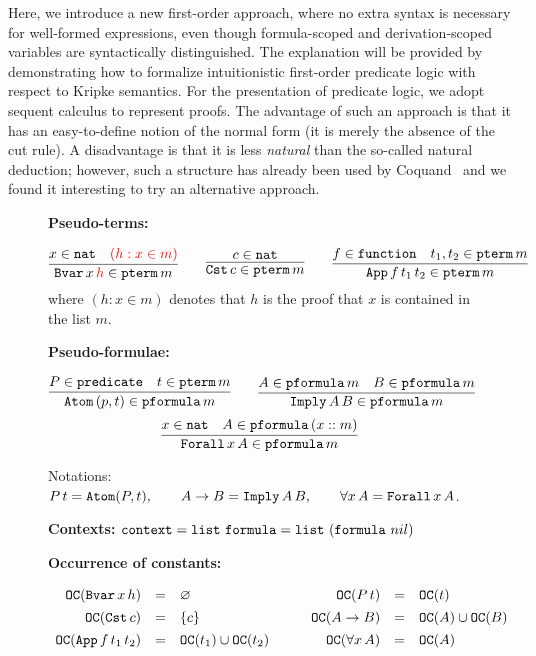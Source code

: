 \documentclass{svjour3}                     %
\newcommand{\seq}[2]{\infer{#2}{#1}}
\newcommand{\sing}[1]{\{ #1 \}}
\newcommand{\alert}[1]{\textcolor{red}{#1}}
\newcommand{\tApp}{\textup{\tt App}}
\newcommand{\tBvar}{\textup{\tt Bvar}}
\newcommand{\tCst}{\textup{\tt Cst}}
\newcommand{\tAtom}{\textup{\tt Atom}}
\newcommand{\tImply}{\textup{\tt Imply}}
\newcommand{\tForall}{\textup{\tt Forall}}
\newcommand{\tnat}{\textup{\tt nat}}
\newcommand{\tfunction}{\textup{\tt function}}
\newcommand{\tpredicate}{\textup{\tt predicate}}
\newcommand{\tpterm}{\textup{\tt pterm}}
\newcommand{\tpfml}{\textup{\tt pformula}}
\newcommand{\tfml}{\textup{\tt formula}}
\newcommand{\tcontext}{\textup{\tt context}}
\newcommand{\tOC}{\textup{\tt OC}}
\newcommand{\tlist}{\textup{\tt list}}
\begin{document}
Here, we introduce a new first-order approach, where no extra syntax is necessary for well-formed expressions, even though formula-scoped and derivation-scoped variables are syntactically distinguished. The explanation will be provided by demonstrating how to formalize intuitionistic first-order predicate logic with respect to Kripke semantics. For the presentation of predicate logic, we adopt sequent calculus to represent proofs. The advantage of such an approach is that it has an easy-to-define notion of the normal form (it is merely the absence of the cut rule). A disadvantage is that it is less \textit{natural} than the so-called natural deduction; however, such a structure has already been used by Coquand~\cite{cCoquand93} and we found it interesting to try an alternative approach.

\begin{figure}[t]
\textbf{Pseudo-terms:}

\[
\vcenter{\seq{x \in \tnat & \alert{(h: x \in m)}}{\tBvar\, x\, \alert{h} \in \tpterm \, m}}
\qquad
\vcenter{\seq{c \in \tnat}{\tCst \, c \in \tpterm\, m}}
\qquad
\vcenter{\seq{f \in \tfunction & t_1, t_2\in \tpterm\, m}{\tApp\, f\, t_1\, t_2 \in \tpterm\, m}}
\]
where $(h:x \in m)$ denotes that $h$ is the proof that $x$ is contained in the list $m$.\medskip

\textbf{Pseudo-formulae:}

 \[
  \seq{P\in \tpredicate & t \in \tpterm\, m}{\tAtom \, (p, t) \in \tpfml \, m}\qquad
  \seq{A \in \tpfml\, m & B \in \tpfml \, m}{\tImply\, A\, B \in \tpfml\, m}
  \]
  \[
  \seq{x \in \tnat & A \in \tpfml \, (x :: m)}{\tForall\, x\, A \in \tpfml\, m}
  \]

Notations: $P\, t = \tAtom(P, t), \qquad A \to B = \tImply\, A\, B, \qquad \forall x\, A = \tForall\, x\, A$. \medskip

\textbf{Contexts:} $\tcontext = \tlist\,\, \tfml = \tlist\,\, (\tfml\,\, nil)$\medskip

\textbf{Occurrence of constants:}

\[
\begin{array}{rcl}
  \tOC(\tBvar\, x\, h) & = & \varnothing\\[1ex]
  \tOC(\tCst\, c) & = & \sing{c}\\[1ex]
  \tOC(\tApp\, f\, t_1\, t_2) & = & \tOC(t_1) \cup \tOC(t_2)
\end{array} \qquad
\begin{array}{rcl}
  \tOC(P\, t) & = & \tOC(t)\\[1ex]
  \tOC(A \to B) & = & \tOC(A) \cup \tOC(B)\\[1ex]
  \tOC(\forall x\, A) & = & \tOC(A)
\end{array}
\]


\end{figure}
\end{document}
